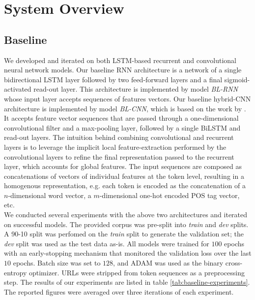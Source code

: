 \documentclass[11pt]{article}
\begin{document}
\section{System Overview}
\subsection{Baseline}
We developed and iterated on both LSTM-based \cite{hochreiter1997long} recurrent and convolutional \cite{o2015introduction}
neural network models. Our baseline RNN architecture is a network of a single bidirectional LSTM layer followed by two feed-forward layers and a final sigmoid-activated read-out layer. This architecture is implemented by model \emph{BL-RNN}
whose input layer accepts sequences of features vectors. Our baseline hybrid-CNN architecture is implemented by model
\emph{BL-CNN}, which is based on the work by . It accepts feature vector
sequences that are passed through a one-dimensional convolutional filter and a max-pooling layer, followed by a single BiLSTM and read-out
layers. The intuition behind combining convolutional and recurrent layers is to leverage the implicit local feature-extraction performed by the convolutional layers to refine the final representation passed to the recurrent layer, which accounts for global features. The input sequences are composed as concatenations of vectors of individual features at the token level,
resulting in a homogenous representation, e.g. each token is encoded as the concatenation of a $n$-dimensional word vector,
a $m$-dimensional one-hot encoded POS tag vector, etc.\\

We conducted several experiments with the above two architectures and iterated on successful models. The provided corpus was
pre-split into \emph{train} and \emph{dev} splits. A 90-10 split was perfomed on the \emph{train} split to generate
the validation set; the \emph{dev} split was used as the test data as-is. All models were trained for $100$ epochs with an
early-stopping mechanism that monitored the validation loss over the last $10$ epochs. Batch size was set to $128$, and ADAM
\cite{kingma2014adam} was used as the binary cross-entropy optimizer. URLs were stripped from token sequences as a preprocessing
step. The results of our experiments are listed in table \ref{tab:baseline-experiments}. The reported figures were averaged over three iterations of each experiment.
\end{document}
